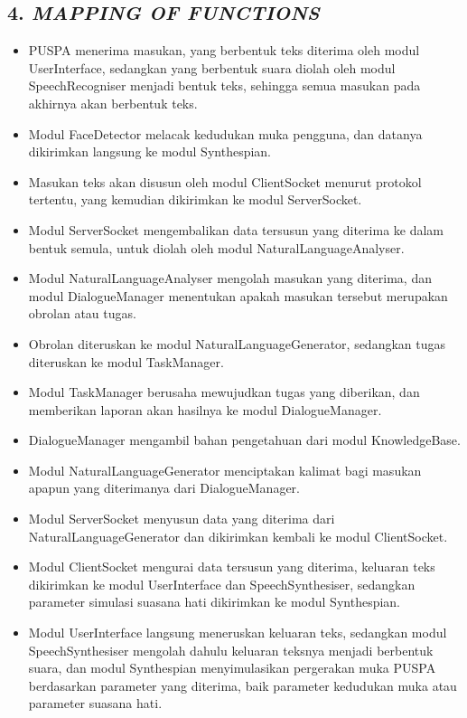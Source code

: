 \subsection*{\textcolor{subsectioncolor}{\textsf{4. \textit{MAPPING OF FUNCTIONS}}}}


\begin{itemize}
\item PUSPA menerima masukan, yang berbentuk teks diterima oleh modul UserInterface, sedangkan yang berbentuk suara diolah oleh modul SpeechRecogniser menjadi bentuk teks, sehingga semua masukan pada akhirnya akan berbentuk teks.
\item Modul FaceDetector melacak kedudukan muka pengguna, dan datanya dikirimkan langsung ke modul Synthespian.
\item Masukan teks akan disusun oleh modul ClientSocket menurut protokol tertentu, yang kemudian dikirimkan ke modul ServerSocket.
\item Modul ServerSocket mengembalikan data tersusun yang diterima ke dalam bentuk semula, untuk diolah oleh modul NaturalLanguageAnalyser.
\item Modul NaturalLanguageAnalyser mengolah masukan yang diterima, dan modul DialogueManager menentukan apakah masukan tersebut merupakan obrolan atau tugas.
\item Obrolan diteruskan ke modul NaturalLanguageGenerator, sedangkan tugas diteruskan ke modul TaskManager.
\item Modul TaskManager berusaha mewujudkan tugas yang diberikan, dan memberikan laporan akan hasilnya ke modul DialogueManager.
\item DialogueManager mengambil bahan pengetahuan dari modul KnowledgeBase.
\item Modul NaturalLanguageGenerator menciptakan kalimat bagi masukan apapun yang diterimanya dari DialogueManager.
\item Modul ServerSocket menyusun data yang diterima dari NaturalLanguageGenerator dan dikirimkan kembali ke modul ClientSocket.
\item Modul ClientSocket mengurai data tersusun yang diterima, keluaran teks dikirimkan ke modul UserInterface dan SpeechSynthesiser, sedangkan parameter simulasi suasana hati dikirimkan ke modul Synthespian.
\item Modul UserInterface langsung meneruskan keluaran teks, sedangkan modul SpeechSynthesiser mengolah dahulu keluaran teksnya menjadi berbentuk suara, dan modul Synthespian menyimulasikan pergerakan muka PUSPA berdasarkan parameter yang diterima, baik parameter kedudukan muka atau parameter suasana hati.
\end{itemize}
